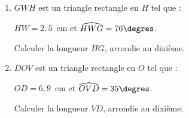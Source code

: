 \begin{minipage}{0.99\linewidth}

\exo


  \begin{multicols}{2}
    \begin{enumerate}
    \item $GWH$ est un triangle rectangle en $H$ tel que :\par
      $HW=2,5$~cm et $\widehat{HWG}=76\degres$.\par
      Calculer la longueur $HG$, arrondie au dixième.\par
      \columnbreak
	\item $DOV$ est un triangle rectangle en $O$ tel que :\par
      $OD=6,9$~cm et $\widehat{OVD}=35\degres$.\par
      Calculer la longueur $VD$, arrondie au dixième.\par	
    \end{enumerate}
  \end{multicols}

\end{minipage}

\vspace{0.5cm}
